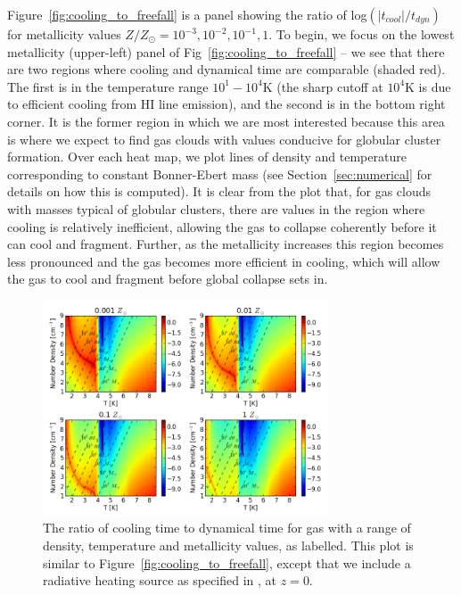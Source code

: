 \documentclass[useAMS,usenatbib]{mn2e}
\begin{document}
Figure~\ref{fig:cooling_to_freefall} is a panel showing the ratio of log$(|t_{cool}|/t_{dyn})$
for metallicity values $Z/Z_{\odot}=10^{-3},10^{-2},10^{-1},1$.  To begin, we focus on the lowest metallicity 
(upper-left) panel of Fig~\ref{fig:cooling_to_freefall} -- we see that there
are two regions where cooling and dynamical time are comparable (shaded red). The first is in the temperature range $10^1-10^4$K (the sharp cutoff at $10^4$K is due to efficient cooling from HI line emission), and the second is in the bottom right
corner. It is the former region in which we are most interested because this area is where we expect to find gas clouds with
values conducive for globular cluster formation. Over each heat map, we plot lines of density and temperature corresponding to constant Bonner-Ebert mass (see Section~\ref{sec:numerical} for details on how this is computed). It is clear from the plot that,
for gas clouds with masses typical of globular clusters, there are 
values in the region where cooling is relatively inefficient, allowing the gas to collapse coherently before it can cool and fragment. Further, as the metallicity
increases this region becomes less pronounced and the gas becomes more efficient in cooling, which will allow the gas to cool and fragment before global collapse sets in.

\begin{figure}
\begin{center}
\mbox{\includegraphics[width=8.5cm]{Images/cooling_to_freefall}}
\end{center}
\caption{\label{fig:cooling_to_freefall_background} The ratio of cooling time to dynamical time for gas with a range of density, temperature and metallicity values, as labelled.  This plot is similar to Figure~\ref{fig:cooling_to_freefall}, except that we include a radiative heating source as specified in \citet{Haardt2012}, at $z=$0.}
\end{figure}
\end{document}
